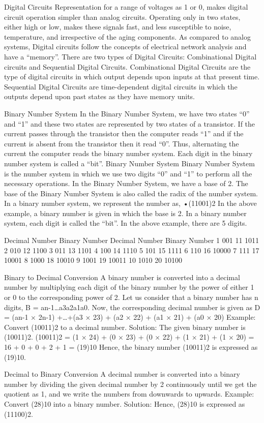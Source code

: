 \documentclass{article}
\begin{document}
Digital Circuits
Representation for a range of voltages as 1 or 0, makes digital circuit operation
simpler than analog circuits. Operating only in two states, either high or low,
makes these signals fast, and less susceptible to noise, temperature, and
irrespective of the aging components.
As compared to analog systems, Digital circuits follow the concepts of electrical
network analysis and have a “memory”.
There are two types of Digital Circuits: Combinational Digital circuits and
Sequential Digital Circuits.
Combinational Digital Circuits are the type of digital circuits in which output
depends upon inputs at that present time.
Sequential Digital Circuits are time-dependent digital circuits in which the
outputs depend upon past states as they have memory units.


Binary Number System
In the Binary Number System, we have two states “0” and “1” and these two
states are represented by two states of a transistor. If the current passes through
the transistor then the computer reads “1” and if the current is absent from the
transistor then it read “0”. Thus, alternating the current the computer reads the
binary number system. Each digit in the binary number system is called a “bit”.
Binary Number System
Binary Number System is the number system in which we use two digits “0” and
“1” to perform all the necessary operations. In the Binary Number System, we
have a base of 2. The base of the Binary Number System is also called the radix of
the number system.
In a binary number system, we represent the number as,
•(11001)2
In the above example, a binary number is given in which the base is 2. In a binary
number system, each digit is called the “bit”. In the above example, there are 5
digits.


Decimal Number
Binary Number
Decimal Number
Binary Number
1
001
11
1011
2
010
12
1100
3
011
13
1101
4
100
14
1110
5
101
15
1111
6
110
16
10000
7
111
17
10001
8
1000
18
10010
9
1001
19
10011
10
1010
20
10100


Binary to Decimal Conversion
A binary number is converted into a decimal number by multiplying each digit of
the binary number by the power of either 1 or 0 to the corresponding power of
2. Let us consider that a binary number has n digits, B = an-1…a3a2a1a0. Now, the
corresponding decimal number is given as
D = (an-1 × 2n-1) +…+(a3 × 23) + (a2 × 22) + (a1 × 21) + (a0 × 20)
Example: Convert (10011)2 to a decimal number.
Solution:
The given binary number is (10011)2.
(10011)2 = (1 × 24) + (0 × 23) + (0 × 22) + (1 × 21) + (1 × 20) = 16 + 0 + 0 + 2 + 1 = 
(19)10
Hence, the binary number (10011)2 is expressed as (19)10.


Decimal to Binary Conversion
A decimal number is converted into a binary number by dividing the given
decimal number by 2 continuously until we get the quotient as 1, and we write
the numbers from downwards to upwards.
Example: Convert (28)10 into a binary number.
Solution:
Hence, (28)10 is expressed as (11100)2.
\end{document}
